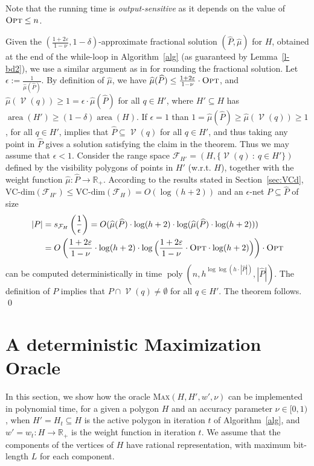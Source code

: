 \documentclass[a4paper,11pt]{article}
\def\RR{\mathbb R}
\def\cF{\mathcal F}
\def\cV{\mathcal V}
\def\eps{\varepsilon}
\newcommand{\poly}{\operatorname{poly}}
\newcommand{\area}{\operatorname{area}}
\newcommand{\Vis}{\operatorname{\cV}}
\def \VCd {\text{VC-dim}}
\def \MO {\textsc{Max}}
\def \OPT {\textsc{Opt}}
\begin{document}
    
    Note that the running time is {\it output-sensitive} as it depends on the value of $\OPT\le n$. 
    
 
    \medskip
    
Given the $(\frac{1+2\eps}{1-\nu},1-\delta)$-approximate fractional solution $(\widehat P,\widehat\mu)$ for $H$, obtained at the end of the while-loop in Algorithm~\ref{alg} (as guaranteed by Lemma~\ref{l-bd2}), we use a similar argument as in \cite{ERS05} for rounding the fractional solution. Let $\epsilon:=\frac1{\widehat\mu(\widehat P)}$. By definition of $\widehat \mu$, we have $\widehat\mu(\widehat P)\le\frac{1+2\eps}{1-\nu}\cdot\OPT$, and $\widehat\mu(\Vis(q))\ge 1=\epsilon\cdot\widehat\mu(\widehat P)$ for all $q\in H'$, where $H'\subseteq H$ has $\area(H')\ge(1-\delta)\area(H)$. If $\epsilon=1$ than $1=\widehat\mu(\widehat P)\ge\widehat \mu(\Vis(q))\ge 1$, for all $q\in H'$, implies that $\widehat P\subseteq\Vis(q)$ for all $q\in H'$, and thus taking any point in $\widehat P$ gives a solution satisfying the claim in the theorem. Thus we may assume that $\epsilon<1$.
Consider the range space $\cF_{H'}=(H,\{\Vis(q)~:~q\in H'\})$ defined by the visibility polygons of points in $H'$ (w.r.t. $H$), together with the weight function $\widehat\mu:\widehat P\to\RR_+$. According to the results stated in Section~\ref{sec:VCd}, $\VCd(\cF_{H'})\le\VCd(\cF_H)=O(\log (h+2))$ and an $\epsilon$-net $P\subseteq \widehat P$ of size 
\begin{align*}
|P|&=s_{\cF_H}\left(\frac{1}{\epsilon}\right)=O(\widehat\mu(\widehat P)\cdot\log(h+2)\cdot\log(\widehat\mu(\widehat P)\cdot\log( h+2)))\\&=O\left(\frac{1+2\eps}{1-\nu}\cdot\log(h+2)\cdot\log\Big(\frac{1+2\eps}{1-\nu}\cdot\OPT\cdot\log(h+2)\Big)\right)\cdot\OPT
\end{align*} 
can be computed deterministically in time $\poly(n,h^{\log\log (h\cdot|\widehat P|)},|\widehat P|)$.  The definition of $P$ implies that $P\cap \Vis(q)\neq\emptyset$ for all $q\in H'$. The theorem follows.  
\qed

	


\section{A deterministic Maximization Oracle} \label{sec:det}

In this section, we show how the oracle \MO$(H,H',w',\nu)$ can be implemented in polynomial time, for a given a polygon $H$  and an accuracy parameter $\nu\in[0,1)$, when $H'=H_t\subseteq H$ is the active polygon in iteration $t$ of Algorithm~\ref{alg}, and  $w'=w_t:H\to\RR_+$ is the weight function in iteration $t$.
We assume that the components of the vertices of $H$ have rational representation, with maximum bit-length $L$ for each component.  
\end{document}
